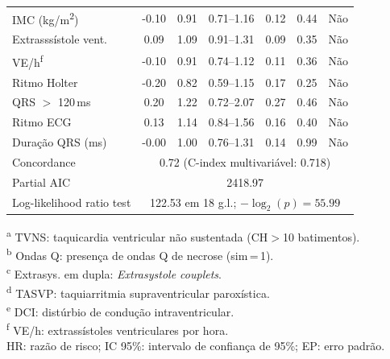 \begin{table}[htbp]
{\begin{tabular}{lcccccc}
			IMC (kg/m\textsuperscript{2})
			           & -0.10                                                         & 0.91 & 0.71--1.16 & 0.12 & 0.44     & N\~ao           \\
			Extrasss\'istole vent.
			           & 0.09                                                          & 1.09 & 0.91--1.31 & 0.09 & 0.35     & N\~ao           \\
			VE/h\textsuperscript{f}
			           & -0.10                                                         & 0.91 & 0.74--1.12 & 0.11 & 0.36     & N\~ao           \\
			Ritmo Holter
			           & -0.20                                                         & 0.82 & 0.59--1.15 & 0.17 & 0.25     & N\~ao           \\
			QRS $>$ 120\,ms
			           & 0.20                                                          & 1.22 & 0.72--2.07 & 0.27 & 0.46     & N\~ao           \\
			Ritmo ECG
			           & 0.13                                                          & 1.14 & 0.84--1.56 & 0.16 & 0.40     & N\~ao           \\
			Dura\c{c}\~ao QRS (ms)
			           & -0.00                                                         & 1.00 & 0.76--1.31 & 0.14 & 0.99     & N\~ao           \\
			\midrule
			Concordance
			           & \multicolumn{6}{c}{0.72 \quad (C-index multivariável: 0.718)}                                                         \\
			Partial AIC
			           & \multicolumn{6}{c}{2418.97}                                                                                           \\
			Log-likelihood ratio test
			           & \multicolumn{6}{c}{122.53 em 18 g.l.; $-\log_2(p)=55.99$}                                                             \\
			\bottomrule
		\end{tabular}%
	}
	\begin{flushleft}
		\footnotesize
		\textsuperscript{a} TVNS: taquicardia ventricular não sustentada (CH$>$10 batimentos).\\
		\textsuperscript{b} Ondas Q: presença de ondas Q de necrose (sim\,=\,1).\\
		\textsuperscript{c} Extrasys. em dupla: \textit{Extrasystole couplets}.\\
		\textsuperscript{d} TASVP: taquiarritmia supraventricular paroxística.\\
		\textsuperscript{e} DCI: distúrbio de condução intraventricular.\\
		\textsuperscript{f} VE/h: extrassístoles ventriculares por hora.\\
		HR: razão de risco; IC 95\%: intervalo de confiança de 95\%; EP: erro padrão.
	\end{flushleft}
\end{table}

